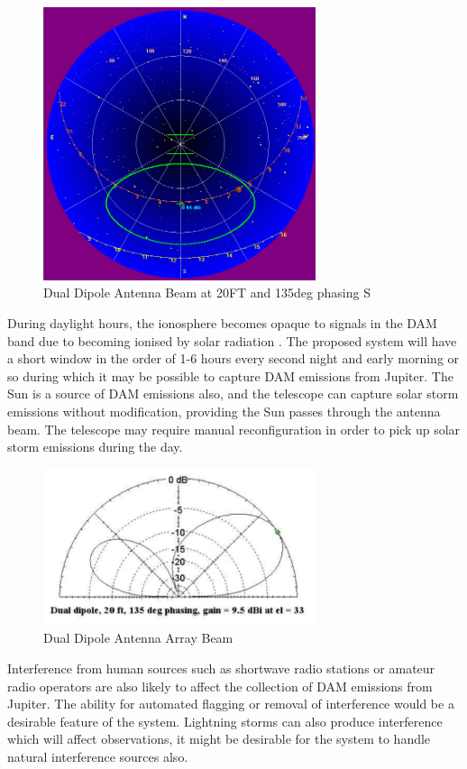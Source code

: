 \documentclass[runningheads,a4paper]{llncs}
\begin{document}
%
\begin{figure}[here]
\centering
\includegraphics[width=8cm]{images/07}
\caption{Dual Dipole Antenna Beam at 20FT and 135deg phasing S \citep{nasa12}}
\label{fig:dual_dipole_20ft_135phasing_s}
\end{figure}
%

During daylight hours, the ionosphere becomes opaque to signals in the \gls{DAM} band due to becoming ionised by solar radiation \citep{nasa-ionosphere-12}. The proposed system will have a short window in the order of 1-6 hours every second night and early morning or so during which it may be possible to capture \gls{DAM} emissions from Jupiter. The Sun is a source of \gls{DAM} emissions also, and the telescope can capture solar storm emissions without modification, providing the Sun passes through the antenna beam. The telescope may require manual reconfiguration in order to pick up solar storm emissions during the day.


%
\begin{figure}[here]
\centering
\includegraphics[width=8cm]{images/09}
\caption{Dual Dipole Antenna Array Beam\citep{nasa12}}
\label{fig:dual_dipole_antenna_array_beam}
\end{figure}
%

Interference from human sources such as shortwave radio stations or amateur radio operators are also likely to affect the collection of \gls{DAM} emissions from Jupiter. The ability for automated flagging or removal of interference would be a desirable feature of the system. Lightning storms can also produce interference which will affect observations, it might be desirable for the system to handle natural interference sources also.
\end{document}
